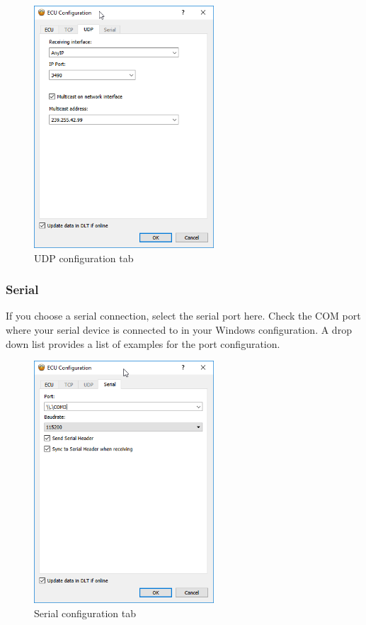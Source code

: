 \documentclass[a4paper,11pt]{article}
\begin{document}
\begin{figure}[h]
 \centering
 \includegraphics[width=0.6\textwidth]{images/ECU_dialogUDP.png}
 \caption{UDP configuration tab}
 \label{fig:udpconfigurationtab}
\end{figure}



\subsubsection{Serial}


If you choose a serial connection, select the serial port here. Check the COM port
where your serial device is connected to in your Windows configuration. A drop down
list provides a list of examples for the port configuration.

\begin{figure}[H]
 \centering
  \includegraphics[width=0.6\textwidth]{images/ecu_dialog_serial01.png}
 \caption{Serial configuration tab}
 \label{fig:serialconfigurationtab}
\end{figure}
\end{document}

